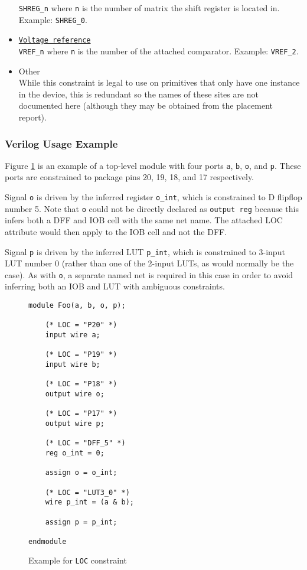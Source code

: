 \documentclass[11pt]{article}
\newcommand{\tokenstyle}[1]{\texttt{#1}}
\newcommand{\wirestyle}[1]{\texttt{#1}}
\newcommand{\valuestyle}[1]{\texttt{#1}}
\newcommand{\strvaluestyle}[1]{\valuestyle{\textquotedbl#1\textquotedbl}}
\newcommand{\whenstyle}[1]{{\fontseries{sb}\selectfont#1}}
\newcommand{\tokenref}[2]{\hyperref[#2]{\tokenstyle{#1}}}
\begin{document}
\begin{itemize}
\strvaluestyle{SHREG\_n} where \tokenstyle{n} is the number of matrix the shift register is located in. 
Example: \strvaluestyle{SHREG\_0}.
\item \whenstyle{\tokenref{Voltage reference}{gp-vref}}\\
\strvaluestyle{VREF\_n} where \tokenstyle{n} is the number of the attached comparator. Example: 
\strvaluestyle{VREF\_2}.
\item \whenstyle{Other} \\
While this constraint is legal to use on primitives that only have one instance in the device, this is redundant so the 
names of these sites are not documented here (although they may be obtained from the placement report).
\end{itemize}

\pagebreak
\subsubsection{Verilog Usage Example}

Figure \ref{constraint-loc} is an example of a top-level module with four ports \wirestyle{a}, \wirestyle{b},
\wirestyle{o}, and \wirestyle{p}. These ports are constrained to package pins 20, 19, 18, and 17 respectively.

Signal \wirestyle{o} is driven by the inferred register \wirestyle{o\_int}, which is constrained to D flipflop
number 5. Note that \wirestyle{o} could not be directly declared as \tokenstyle{output reg} because this infers both a 
DFF and IOB cell with the same net name. The attached LOC attribute would then apply to the IOB cell and not the DFF.

Signal \wirestyle{p} is driven by the inferred LUT \wirestyle{p\_int}, which is constrained to 3-input LUT number 0 
(rather than one of the 2-input LUTs, as would normally be the case). As with \wirestyle{o}, a separate named net is 
required in this case in order to avoid inferring both an IOB and LUT with ambiguous constraints.

\begin{figure}[h]
\begin{lstlisting}
module Foo(a, b, o, p);

	(* LOC = "P20" *)
	input wire a;

	(* LOC = "P19" *)
	input wire b;

	(* LOC = "P18" *)
	output wire o;
	
	(* LOC = "P17" *)
	output wire p;
	
	(* LOC = "DFF_5" *)
	reg o_int = 0;
	
	assign o = o_int;
	
	(* LOC = "LUT3_0" *)
	wire p_int = (a & b);
	
	assign p = p_int;

endmodule
\end{lstlisting}
\caption{Example for \tokenstyle{LOC} constraint}
\label{constraint-loc}
\end{figure}
\end{document}
